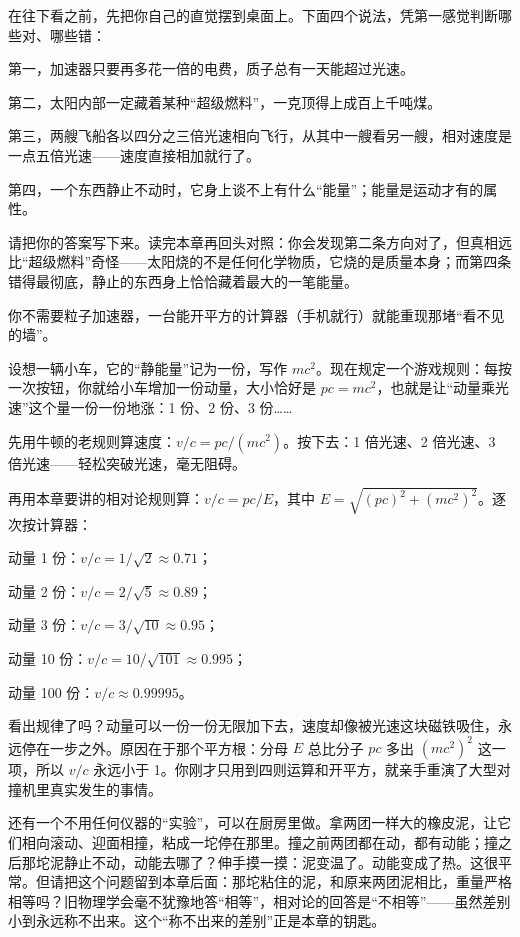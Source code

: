 
\begin{mainline}
在往下看之前，先把你自己的直觉摆到桌面上。下面四个说法，凭第一感觉判断哪些对、哪些错：

第一，加速器只要再多花一倍的电费，质子总有一天能超过光速。

第二，太阳内部一定藏着某种“超级燃料”，一克顶得上成百上千吨煤。

第三，两艘飞船各以四分之三倍光速相向飞行，从其中一艘看另一艘，相对速度是一点五倍光速——速度直接相加就行了。

第四，一个东西静止不动时，它身上谈不上有什么“能量”；能量是运动才有的属性。

请把你的答案写下来。读完本章再回头对照：你会发现第二条方向对了，但真相远比“超级燃料”奇怪——太阳烧的不是任何化学物质，它烧的是质量本身；而第四条错得最彻底，静止的东西身上恰恰藏着最大的一笔能量。
\end{mainline}


\begin{experiment}[用计算器把一辆车推向光速]
你不需要粒子加速器，一台能开平方的计算器（手机就行）就能重现那堵“看不见的墙”。

设想一辆小车，它的“静能量”记为一份，写作 \(mc^{2}\)。现在规定一个游戏规则：每按一次按钮，你就给小车增加一份动量，大小恰好是 \(pc=mc^{2}\)，也就是让“动量乘光速”这个量一份一份地涨：1 份、2 份、3 份……

先用牛顿的老规则算速度：\(v/c=pc/(mc^{2})\)。按下去：1 倍光速、2 倍光速、3 倍光速——轻松突破光速，毫无阻碍。

再用本章要讲的相对论规则算：\(v/c=pc/E\)，其中 \(E=\sqrt{(pc)^{2}+(mc^{2})^{2}}\)。逐次按计算器：

动量 1 份：\(v/c=1/\sqrt{2}\approx0.71\)；

动量 2 份：\(v/c=2/\sqrt{5}\approx0.89\)；

动量 3 份：\(v/c=3/\sqrt{10}\approx0.95\)；

动量 10 份：\(v/c=10/\sqrt{101}\approx0.995\)；

动量 100 份：\(v/c\approx0.99995\)。

看出规律了吗？动量可以一份一份无限加下去，速度却像被光速这块磁铁吸住，永远停在一步之外。原因在于那个平方根：分母 \(E\) 总比分子 \(pc\) 多出 \((mc^{2})^{2}\) 这一项，所以 \(v/c\) 永远小于 1。你刚才只用到四则运算和开平方，就亲手重演了大型对撞机里真实发生的事情。
\end{experiment}

\begin{mainline}
还有一个不用任何仪器的“实验”，可以在厨房里做。拿两团一样大的橡皮泥，让它们相向滚动、迎面相撞，粘成一坨停在那里。撞之前两团都在动，都有动能；撞之后那坨泥静止不动，动能去哪了？伸手摸一摸：泥变温了。动能变成了热。这很平常。但请把这个问题留到本章后面：那坨粘住的泥，和原来两团泥相比，重量严格相等吗？旧物理学会毫不犹豫地答“相等”，相对论的回答是“不相等”——虽然差别小到永远称不出来。这个“称不出来的差别”正是本章的钥匙。
\end{mainline}

